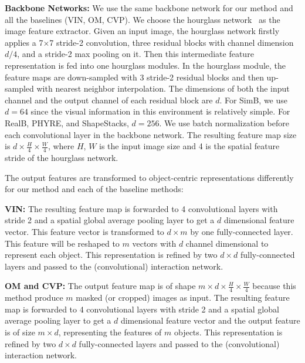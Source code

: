 \documentclass{article} \usepackage{iclr2021_conference,times}
\newcommand{\numobj}{m}
\newcommand{\imh}{H}
\newcommand{\imw}{W}
\newcommand{\featdim}{d}
\begin{document}
\textbf{Backbone Networks:} We use the same backbone network for our method and all the baselines (VIN, OM, CVP). We choose the hourglass network~\citep{newell2016stacked} as the image feature extractor. Given an input image, the hourglass network firstly applies a 7$\times$7 stride-2 convolution, three residual blocks with channel dimension $\featdim / 4$, and a stride-2 max pooling on it. Then this intermediate feature representation is fed into one hourglass modules. In the hourglass module, the feature maps are down-sampled with 3 stride-2 residual blocks and then up-sampled with nearest neighbor interpolation. The dimensions of both the input channel and the output channel of each residual block are $\featdim$. For SimB, we use $\featdim=64$ since the visual information in this environment is relatively simple. For RealB, PHYRE, and ShapeStacks, $\featdim=256$. We use batch normalization before each convolutional layer in the backbone network. The resulting feature map size is $\featdim \times \frac{\imh}{4} \times \frac{\imw}{4}$, where $\imh$, $\imw$ is the input image size and 4 is the spatial feature stride of the hourglass network.

The output features are transformed to object-centric representations differently for our method and each of the baseline methods:

\textbf{VIN:} The resulting feature map is forwarded to 4 convolutional layers with stride 2 and a spatial global average pooling layer to get a $\featdim$ dimensional feature vector. This feature vector is transformed to $\featdim \times \numobj$ by one fully-connected layer. This feature will be reshaped to $\numobj$ vectors with $\featdim$ channel dimensional to represent each object. This representation is refined by two $\featdim \times \featdim$ fully-connected layers and passed to the (convolutional) interaction network.

\textbf{OM and CVP:} The output feature map is of shape $\numobj \times \featdim \times \frac{\imh}{4} \times \frac{\imw}{4}$ because this method produce $\numobj$ masked (or cropped) images as input. The resulting feature map is forwarded to 4 convolutional layers with stride 2 and a spatial global average pooling layer to get a $\featdim$ dimensional feature vector and the output feature is of size $\numobj \times \featdim$, representing the features of $\numobj$ objects. This representation is refined by two $\featdim \times \featdim$ fully-connected layers and passed to the (convolutional) interaction network.
\end{document}
